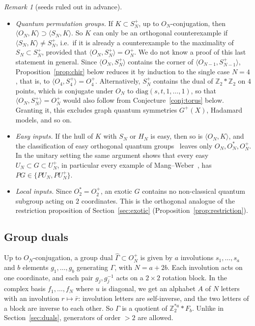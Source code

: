 \documentclass[11pt]{amsart}
\theoremstyle{definition}
\theoremstyle{remark}
\newtheorem{remark}[theorem]{Remark}
\theoremstyle{plain}
\numberwithin{equation}{section}
\numberwithin{table}{section}
\newcommand{\Z}{\mathbb Z}
\begin{document}
\begin{remark}[seeds ruled out in advance]\label{rem:ruledout}
\leavevmode
\begin{itemize}
\item \emph{Quantum permutation groups.} If $K\subset S_N^+$, up to $O_N$-conjugation, then $\langle O_N,K\rangle\supset
\langle S_N,K\rangle$. So $K$ can only be an orthogonal counterexample if $\langle S_N,K\rangle\ne S_N^+$, i.e.\ if it is already
a counterexample to the maximality of $S_N\subset S_N^+$, provided that $\langle O_N,S_N^+\rangle=O_N^+$. We do not know a
proof of this last statement in general. Since $\langle O_N,S_N^+\rangle$ contains the corner of $\langle O_{N-1},S_{N-1}^+\rangle$,
Proposition~\ref{prop:chir} below reduces it by induction to the single case $N=4$, that is, to $\langle O_4,S_4^+\rangle=O_4^+$.
Alternatively, $S_N^+$ contains the dual of $\Z_2*\Z_2$ on $4$ points, which is conjugate under $O_N$ to $\mathrm{diag}(s,t,1,\dots,1)$,
so that $\langle O_N,S_N^+\rangle=O_N^+$ would also follow from Conjecture~\ref{conj:torus} below. Granting it, this excludes graph
quantum symmetries $G^+(X)$, Hadamard models, and so on.
\item \emph{Easy inputs.} If the hull of $K$ with $S_N$ or $H_N$ is easy, then so is $\langle O_N,K\rangle$, and the
classification of easy orthogonal quantum groups~\cite{bcs} leaves only $O_N,O_N^*,O_N^+$. In the unitary setting the same
argument shows that every easy $U_N\subset G\subset U_N^+$, in particular every example of Mang--Weber~\cite{mw}, has
$PG\in\{PU_N,PU_N^+\}$.
\item \emph{Local inputs.} Since $O_2^*=O_2^+$, an exotic $G$ contains no non-classical quantum subgroup acting on $2$
coordinates. This is the orthogonal analogue of the restriction proposition of Section~\ref{sec:exotic} (Proposition~\ref{prop:restriction}).
\end{itemize}
\end{remark}

\subsection{Group duals}\label{sec:gd}

Up to $O_N$-conjugation, a group dual $\widehat\Gamma\subset O_N^+$ is given by $a$ involutions $s_1,\dots,s_a$ and $b$
elements $g_1,\dots,g_b$ generating $\Gamma$, with $N=a+2b$. Each involution acts on one coordinate, and each pair
$g_j,g_j^{-1}$ acts on a $2\times2$ rotation block. In the complex basis $f_1,\dots,f_N$ where $u$ is diagonal, we get an
alphabet $A$ of $N$ letters with an involution $r\mapsto\bar r$: involution letters are self-inverse, and the two letters of a
block are inverse to each other. So $\Gamma$ is a quotient of $\Z_2^{*a}*F_b$. Unlike in Section~\ref{sec:duals}, generators of order
$>2$ are allowed.
\end{document}
